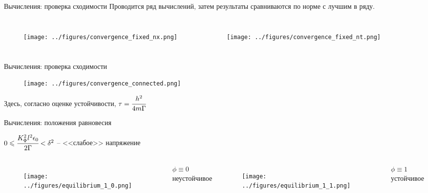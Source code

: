 \documentclass{beamer}
\begin{document}
\begin{frame}{Вычисления: проверка сходимости}
Проводится ряд вычислений, затем результаты сравниваются по норме с лучшим в ряду.
\begin{columns}
\begin{figure}
	\texttt{[image: ../figures/convergence\_fixed\_nx.png]}
\end{figure}
\begin{figure}
	\texttt{[image: ../figures/convergence\_fixed\_nt.png]}
\end{figure}
\end{columns}
\end{frame}


\begin{frame}{Вычисления: проверка сходимости}
\vspace{-0.2cm}
\begin{figure}
	\texttt{[image: ../figures/convergence\_connected.png]}
\end{figure}
\vspace{-0.8cm}
\begin{center}
	\hspace{-0.4cm}
	Здесь, согласно оценке устойчивости, $\tau = \cfrac{h^2}{4m \Gamma}$
\end{center}
\end{frame}


\begin{frame}{Вычисления: положения равновесия}
\begin{center}
	$0 \leqslant \cfrac{K_\Phi^2 l^2 \epsilon_0}{2 \Gamma} < \delta^2$ -- <<слабое>> напряжение
\end{center}
\begin{columns}
\begin{figure}
	\texttt{[image: ../figures/equilibrium\_1\_0.png]}
\end{figure}
\begin{center}
	$\phi \equiv 0$ \\
	неустойчивое
\end{center}
\begin{figure}
	\texttt{[image: ../figures/equilibrium\_1\_1.png]}
\end{figure}
\begin{center}
	$\phi \equiv 1$ \\
	устойчивое
\end{center}
\end{columns}
\end{frame}
\end{document}

